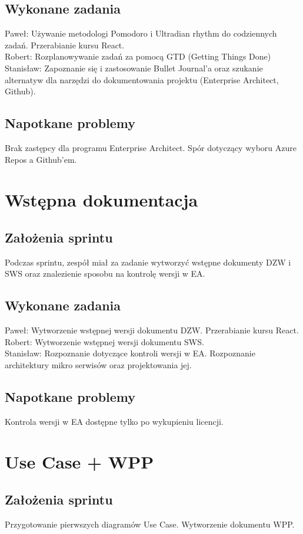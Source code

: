 \documentclass[a4paper,11pt]{report}
\begin{document}
\subsection {Wykonane zadania}
Paweł: Używanie metodologi Pomodoro i Ultradian rhythm do codziennych zadań. Przerabianie kursu React.\\
Robert: Rozplanowywanie zadań za pomocą GTD (Getting Things Done)\\
Stanisław: Zapoznanie się i zastosowanie Bullet Journal'a oraz szukanie alternatyw dla narzędzi do dokumentowania projektu (Enterprise Architect, Github).\\
\subsection {Napotkane problemy}
Brak zastępcy dla programu Enterprise Architect. Spór dotyczący wyboru Azure Repos a Github'em.

\section {Wstępna dokumentacja}
\subsection {Założenia sprintu}
Podczas sprintu, zespół miał za zadanie wytworzyć wstępne dokumenty DZW i SWS oraz znalezienie sposobu na kontrolę wersji w EA.
\subsection {Wykonane zadania}
Paweł: Wytworzenie wstępnej wersji dokumentu DZW. Przerabianie kursu React.\\
Robert: Wytworzenie wstępnej wersji dokumentu SWS.\\
Stanisław: Rozpoznanie dotyczące kontroli wersji w EA. Rozpoznanie architektury mikro serwisów oraz projektowania jej.\\
\subsection {Napotkane problemy} 
Kontrola wersji w EA dostępne tylko po wykupieniu licencji.

\section {Use Case + WPP}
\subsection {Założenia sprintu}
Przygotowanie pierwszych diagramów Use Case. Wytworzenie dokumentu WPP.
\end{document}
